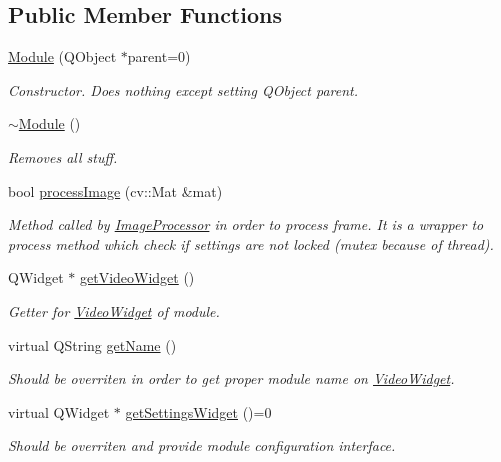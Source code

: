 \subsection*{Public Member Functions}
\begin{DoxyCompactItemize}
\item 
\hyperlink{class_module_a898c66ef74395bb450900d479b51fc21}{Module} (QObject $\ast$parent=0)
\begin{DoxyCompactList}\small\item\em Constructor. Does nothing except setting QObject parent. \item\end{DoxyCompactList}\item 
\hypertarget{class_module_a7c9d9c096786d127590fdd8aa2b7d681}{
\hyperlink{class_module_a7c9d9c096786d127590fdd8aa2b7d681}{$\sim$Module} ()}
\label{dd/df9/class_module_a7c9d9c096786d127590fdd8aa2b7d681}

\begin{DoxyCompactList}\small\item\em Removes all stuff. \item\end{DoxyCompactList}\item 
bool \hyperlink{class_module_a030fde5f794abbc63e33286e40a0192c}{processImage} (cv::Mat \&mat)
\begin{DoxyCompactList}\small\item\em Method called by \hyperlink{class_image_processor}{ImageProcessor} in order to process frame. It is a wrapper to process method which check if settings are not locked (mutex because of thread). \item\end{DoxyCompactList}\item 
QWidget $\ast$ \hyperlink{class_module_acbca15013c486ec2a6cc2391e4170880}{getVideoWidget} ()
\begin{DoxyCompactList}\small\item\em Getter for \hyperlink{class_video_widget}{VideoWidget} of module. \item\end{DoxyCompactList}\item 
virtual QString \hyperlink{class_module_a1cf07480fdd9a964eb8375bf2fb549b0}{getName} ()
\begin{DoxyCompactList}\small\item\em Should be overriten in order to get proper module name on \hyperlink{class_video_widget}{VideoWidget}. \item\end{DoxyCompactList}\item 
virtual QWidget $\ast$ \hyperlink{class_module_a7a6a83882ef0d9aec623577884ce2fb5}{getSettingsWidget} ()=0
\begin{DoxyCompactList}\small\item\em Should be overriten and provide module configuration interface. \item\end{DoxyCompactList}\end{DoxyCompactItemize}
